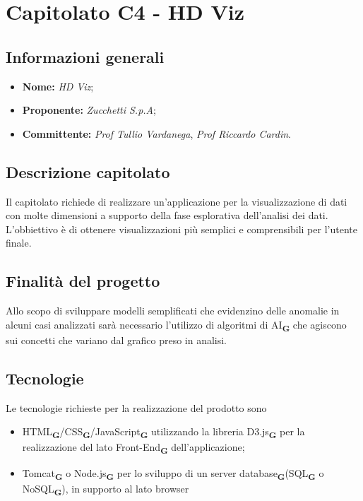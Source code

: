 \section{Capitolato C4 - HD Viz}

\subsection{Informazioni generali}

\begin{itemize}
    \item \textbf{Nome:} \textit{HD Viz};
    \item \textbf{Proponente:} \textit{Zucchetti S.p.A};
    \item \textbf{Committente:} \emph{Prof Tullio Vardanega}, \emph{Prof Riccardo Cardin}.
\end{itemize}

\subsection{Descrizione capitolato}
Il capitolato richiede di realizzare un'applicazione per la
visualizzazione di dati con molte dimensioni a supporto della fase esplorativa
dell'analisi dei dati. L'obbiettivo è di ottenere visualizzazioni più semplici e comprensibili per l'utente finale.

\subsection{Finalità del progetto}
Allo scopo di sviluppare modelli semplificati che evidenzino delle anomalie in alcuni casi analizzati sarà necessario l'utilizzo di algoritmi di AI\textsubscript{\textbf{G}} che agiscono sui concetti che variano dal grafico preso in analisi.

\subsection{Tecnologie}
Le tecnologie richieste per la realizzazione del prodotto sono
\begin{itemize}
    \item HTML\textsubscript{\textbf{G}}/CSS\textsubscript{\textbf{G}}/JavaScript\textsubscript{\textbf{G}} utilizzando la libreria D3.js\textsubscript{\textbf{G}} per la realizzazione del lato Front-End\textsubscript{\textbf{G}} dell'applicazione;
    \item Tomcat\textsubscript{\textbf{G}} o Node.js\textsubscript{\textbf{G}} per lo sviluppo di un server database\textsubscript{\textbf{G}}(SQL\textsubscript{\textbf{G}} o NoSQL\textsubscript{\textbf{G}}), in supporto al lato browser
\end{itemize}

